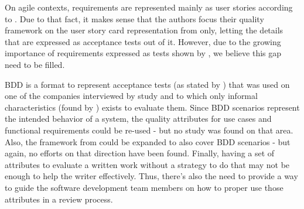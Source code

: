 On agile contexts, requirements are represented mainly as user stories according to \cite{Lucassen_2015}. Due to that fact, it makes sense that the authors focus their quality framework on the user story card representation from \cite{Cohn_2004} only, letting the details that are expressed as acceptance tests out of it. However, due to the growing importance of requirements expressed as tests shown by \cite{Bjarnason_2016}, we believe this gap need to be filled.

BDD is a format to represent acceptance tests (as stated by \cite{Gartner_2012}) that was used on one of the companies interviewed by \cite{Bjarnason_2016} study and to which only informal characteristics (found by \cite{Smart_2014}) exists to evaluate them. Since BDD scenarios represent the intended behavior of a system, the quality attributes for use cases and functional requirements could be re-used - but no study was found on that area. Also, the framework from \cite{Lucassen_2015} could be expanded to also cover BDD scenarios - but again, no efforts on that direction have been found. Finally, having a set of attributes to evaluate a written work without a strategy to do that may not be enough to help the writer effectively. Thus, there's also the need to provide a way to guide the software development team members on how to proper use those attributes in a review process.